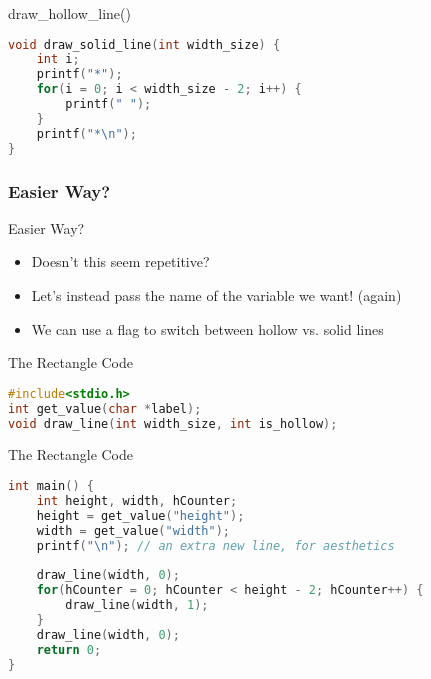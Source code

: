 \documentclass[graphics]{beamer}
\begin{document}
\begin{frame}[fragile]{draw\_hollow\_line()}
    \begin{lstlisting}[language=C,basicstyle=\footnotesize,keywordstyle=\color{blue},commentstyle=\color{green},showstringspaces=false,stringstyle=\color{red}]
void draw_solid_line(int width_size) {
    int i;
    printf("*");
    for(i = 0; i < width_size - 2; i++) {
        printf(" ");
    }
    printf("*\n");
}
    \end{lstlisting}
\end{frame}

\subsubsection{Easier Way?}
\begin{frame}{Easier Way?}
    \begin{itemize}
        \item Doesn't this seem repetitive?
        \pause
        \item Let's instead pass the name of the variable we want! (again)
        \item We can use a flag to switch between hollow vs. solid lines
    \end{itemize}
\end{frame}

\begin{frame}[fragile]{The Rectangle Code}
    \begin{lstlisting}[language=C,basicstyle=\footnotesize,keywordstyle=\color{blue},commentstyle=\color{green},showstringspaces=false,stringstyle=\color{red}]
#include<stdio.h>
int get_value(char *label);
void draw_line(int width_size, int is_hollow);
    \end{lstlisting}
\end{frame}

\begin{frame}[fragile]{The Rectangle Code}
    \begin{lstlisting}[language=C,basicstyle=\footnotesize,keywordstyle=\color{blue},commentstyle=\color{green},showstringspaces=false,stringstyle=\color{red}]
int main() {
    int height, width, hCounter;
    height = get_value("height");
    width = get_value("width");
    printf("\n"); // an extra new line, for aesthetics
    
    draw_line(width, 0);
    for(hCounter = 0; hCounter < height - 2; hCounter++) {
        draw_line(width, 1);
    }
    draw_line(width, 0);
    return 0;
}
    \end{lstlisting}
\end{frame}
\end{document}
